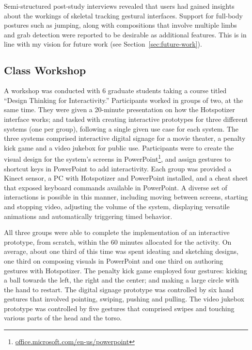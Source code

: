 Semi-structured post-study interviews revealed that users had gained insights about the workings of skeletal tracking gestural interfaces. Support for full-body postures such as jumping, along with compositions that involve multiple limbs and grab detection were reported to be desirable as additional features. This is in line with my vision for future work (see Section~\ref{sec:future-work}).

\subsection{Class Workshop}

A workshop was conducted with 6 graduate students taking a course titled “Design Thinking for Interactivity.” Participants worked in groups of two, at the same time. They were given a 20-minute presentation on how the Hotspotizer interface works; and tasked with creating interactive prototypes for three different systems (one per group), following a single given use case for each system. The three systems comprised interactive digital signage for a movie theater, a penalty kick game and a video jukebox for public use. Participants were to create the visual design for the system’s screens in PowerPoint\footnote{\href{http://office.microsoft.com/en-us/powerpoint/}{office.microsoft.com/en-us/powerpoint}}, and assign gestures to shortcut keys in PowerPoint to add interactivity. Each group was provided a Kinect sensor, a PC with Hotspotizer and PowerPoint installed, and a cheat sheet that exposed keyboard commands available in PowerPoint. A diverse set of interactions is possible in this manner, including moving between screens, starting and stopping video, adjusting the volume of the system, displaying versatile animations and automatically triggering timed behavior.

All three groups were able to complete the implementation of an interactive prototype, from scratch, within the 60 minutes allocated for the activity. On average, about one third of this time was spent ideating and sketching designs, one third on composing visuals in PowerPoint and one third on authoring gestures with Hotspotizer. The penalty kick game employed four gestures: kicking a ball towards the left, the right and the center; and making a large circle with the hand to restart. The digital signage prototype was controlled by six hand gestures that involved pointing, swiping, pushing and pulling. The video jukebox prototype was controlled by five gestures that comprised swipes and touching various parts of the head and the torso.

